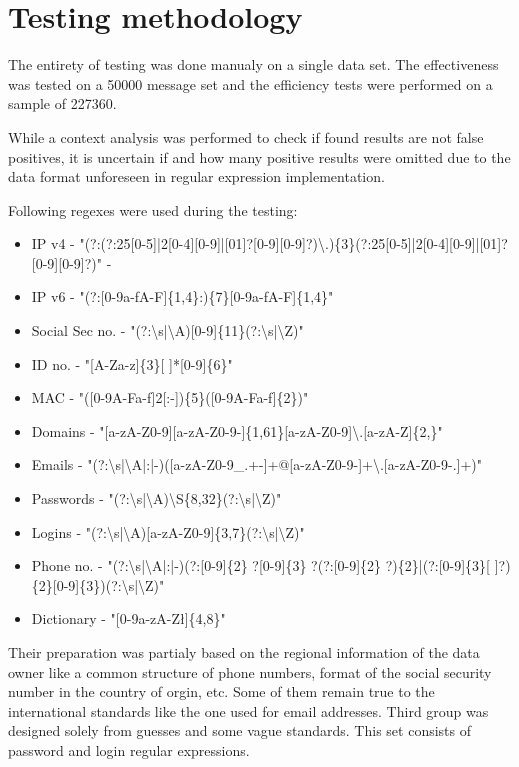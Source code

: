 \documentclass[a4paper,twoside,12pt]{book}
\begin{document}
\section{Testing methodology}

The entirety of testing was done manualy on a single data set. The effectiveness was tested on a 50000 message set and
the efficiency tests were performed on a sample of 227360.

While a context analysis was performed to check if found results are not false positives, it is uncertain if and how many
positive results were omitted due to the data format unforeseen in regular expression implementation. 

Following regexes were used during the testing: 

\begin{itemize}
   \item IP v4 - "(?:(?:25[0-5]|2[0-4][0-9]|[01]?[0-9][0-9]?)\textbackslash .)\{3\}(?:25[0-5]|2[0-4][0-9]|[01]?[0-9][0-9]?)" - 
   \item IP v6 - "(?:[0-9a-fA-F]\{1,4\}:)\{7\}[0-9a-fA-F]\{1,4\}"
   \item Social Sec no. - "(?:\textbackslash s|\textbackslash A)[0-9]\{11\}(?:\textbackslash s|\textbackslash Z)"
   \item ID no. - "[A-Za-z]\{3\}[ ]*[0-9]\{6\}"
   \item MAC - "([0-9A-Fa-f]{2}[:-])\{5\}([0-9A-Fa-f]\{2\})"
   \item Domains - "[a-zA-Z0-9][a-zA-Z0-9-]\{1,61\}[a-zA-Z0-9]\textbackslash .[a-zA-Z]\{2,\}"
   \item Emails - "(?:\textbackslash s|\textbackslash A|:|-)([a-zA-Z0-9\_.+-]+@[a-zA-Z0-9-]+\textbackslash .[a-zA-Z0-9-.]+)"
   \item Passwords - "(?:\textbackslash s|\textbackslash A)\textbackslash S\{8,32\}(?:\textbackslash s|\textbackslash Z)"
   \item Logins - "(?:\textbackslash s|\textbackslash A)[a-zA-Z0-9]\{3,7\}(?:\textbackslash s|\textbackslash Z)"
   \item Phone no. - "(?:\textbackslash s|\textbackslash A|:|-)(?:[0-9]\{2\} ?[0-9]\{3\} ?(?:[0-9]\{2\} ?)\{2\}|(?:[0-9]\{3\}[ ]?)\{2\}[0-9]\{3\})(?:\textbackslash s|\textbackslash Z)"
   \item Dictionary - "[0-9a-zA-Zł]\{4,8\}"
\end{itemize}

Their preparation was partialy based on the regional information of the data owner like a common structure of phone numbers, format of the social security number in the
country of orgin, etc. Some of them remain true to the international standards like the one used for email addresses. Third group was designed solely from guesses and
some vague standards. This set consists of password and login regular expressions.
\end{document}
